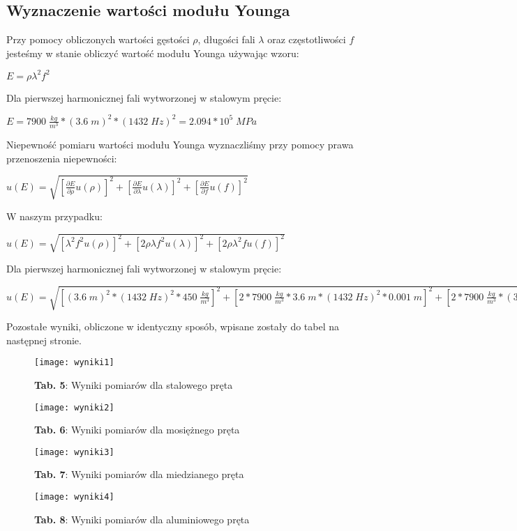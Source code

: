 \documentclass[12pt]{article}
\begin{document}
\subsection{Wyznaczenie wartości modułu Younga}
Przy pomocy obliczonych wartości gęstości $\rho$, długości fali $\lambda$ oraz częstotliwości $f$ jesteśmy w stanie obliczyć wartość modułu Younga używając wzoru:
\begin{center}
\Large $E=\rho\lambda^2f^2$
\end{center}
Dla pierwszej harmonicznej fali wytworzonej w stalowym pręcie: 
\begin{center}
\Large $E=7900\;\frac{kg}{m^3}*(3.6\;m)^2*(1432\;Hz)^2= 2.094*10^5\;MPa$
\end{center}
Niepewność pomiaru wartości modułu Younga wyznaczliśmy przy pomocy prawa przenoszenia niepewności:
\begin{center}
\Large $u(E)=\sqrt{[\frac{\partial{E}}{\partial{\rho}}u(\rho)]^2+[\frac{\partial{E}}{\partial{\lambda}}u(\lambda)]^2
+[\frac{\partial{E}}{\partial{f}}u(f)]^2}$
\end{center}
W naszym przypadku:
\begin{center}
\Large $u(E)=\sqrt{[\lambda^2f^2u(\rho)]^2+[2\rho\lambda{f}^2u(\lambda)]^2
+[2\rho\lambda^2fu(f)]^2}$
\end{center}
Dla pierwszej harmonicznej fali wytworzonej w stalowym pręcie: 
\begin{center}
\scriptsize $u(E)=\sqrt{[(3.6\;m)^2*(1432\;Hz)^2*450\;\frac{kg}{m^3}]^2+[2*7900\;\frac{kg}{m^3}*3.6\;m*(1432\;Hz)^2*0.001\;m]^2 
+[2*7900\;\frac{kg}{m^3}*(3.6\;m)^2*1432\;Hz*5\;Hz]^2}=0.121*10^5\;MPa$
\end{center}
Pozostałe wyniki, obliczone w identyczny sposób, wpisane zostały do tabel na następnej stronie. \newline
\begin{figure}[H]
\centering
\texttt{[image: wyniki1]}
\caption*{\textbf{Tab. 5}: Wyniki pomiarów dla stalowego pręta}
\end{figure} 
\begin{figure}[H]
\centering
\texttt{[image: wyniki2]}
\caption*{\textbf{Tab. 6}: Wyniki pomiarów dla mosiężnego pręta}
\end{figure} 
\begin{figure}[H]
\centering
\texttt{[image: wyniki3]}
\caption*{\textbf{Tab. 7}: Wyniki pomiarów dla miedzianego pręta}
\end{figure} 
\begin{figure}[H]
\centering
\texttt{[image: wyniki4]}
\caption*{\textbf{Tab. 8}: Wyniki pomiarów dla aluminiowego pręta}
\end{figure} \newpage
\end{document}
